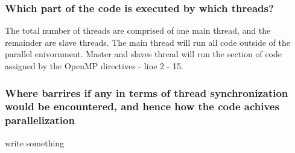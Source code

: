 \subsubsection{Which part of the code is executed by which threads?}
The total number of threads are comprised of one main thread, and the remainder are slave threads.
The main thread will run all code outside of the parallel enivornment. Master and slaves thread will 
run the section of code assigned by the OpenMP directives - line 2 - 15.

\subsubsection{Where barrires if any in terms of thread synchronization would be encountered,
and hence how the code achives parallelization}
write something